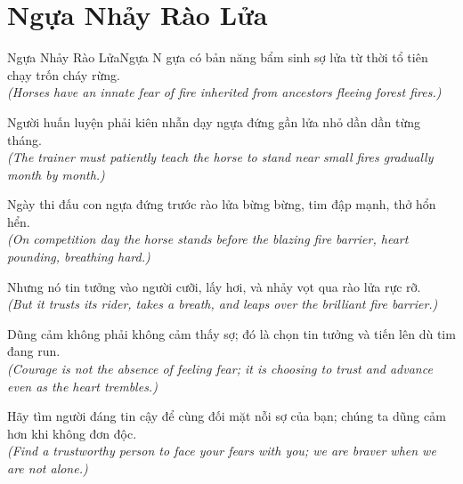 \section{Ngựa Nhảy Rào Lửa}
\begin{truyen}{Ngựa Nhảy Rào Lửa}{Ngựa}
N gựa có bản năng bẩm sinh sợ lửa từ thời tổ tiên chạy trốn cháy rừng.\\
\textit{(Horses have an innate fear of fire inherited from ancestors fleeing forest fires.)}

Người huấn luyện phải kiên nhẫn dạy ngựa đứng gần lửa nhỏ dần dần từng tháng.\\
\textit{(The trainer must patiently teach the horse to stand near small fires gradually month by month.)}

Ngày thi đấu con ngựa đứng trước rào lửa bừng bừng, tim đập mạnh, thở hổn hển.\\
\textit{(On competition day the horse stands before the blazing fire barrier, heart pounding, breathing hard.)}

Nhưng nó tin tưởng vào người cưỡi, lấy hơi, và nhảy vọt qua rào lửa rực rỡ.\\
\textit{(But it trusts its rider, takes a breath, and leaps over the brilliant fire barrier.)}

Dũng cảm không phải không cảm thấy sợ; đó là chọn tin tưởng và tiến lên dù tim đang run.\\
\textit{(Courage is not the absence of feeling fear; it is choosing to trust and advance even as the heart trembles.)}

\end{truyen}
\begin{baihoc}
  Hãy tìm người đáng tin cậy để cùng đối mặt nỗi sợ của bạn; chúng ta dũng cảm hơn khi không đơn độc.\\
  \textit{(Find a trustworthy person to face your fears with you; we are braver when we are not alone.)}
\end{baihoc}


